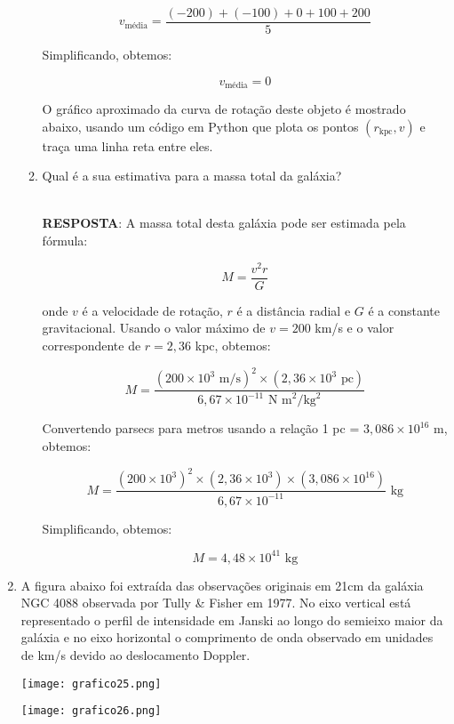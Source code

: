 \documentclass[a4paper,12pt]{article}
\begin{document}
\begin{enumerate}
\begin{enumerate}
$$v_{\text{média}} = \frac{(-200) + (-100) + 0 + 100 + 200}{5}$$

Simplificando, obtemos:

$$v_{\text{média}} = 0$$

O gráfico aproximado da curva de rotação deste objeto é mostrado abaixo, usando um código em Python que plota os pontos $(r_{\text{kpc}}, v)$ e traça uma linha reta entre eles.

\noindent\hrulefill

\item Qual é a sua estimativa para a massa total da galáxia?

\noindent\hrulefill\\\textbf{RESPOSTA}: A massa total desta galáxia pode ser estimada pela fórmula:

$$M = \frac{v^2 r}{G}$$

onde $v$ é a velocidade de rotação, $r$ é a distância radial e $G$ é a constante gravitacional. Usando o valor máximo de $v = 200$ km/s e o valor correspondente de $r = 2,36$ kpc, obtemos:

$$M = \frac{(200 \times 10^3 \text{ m/s})^2 \times (2,36 \times 10^3 \text{ pc})}{6,67 \times 10^{-11} \text{ N m}^2/\text{kg}^2}$$

Convertendo parsecs para metros usando a relação 1 pc = $3,086 \times 10^{16}$ m, obtemos:

$$M = \frac{(200 \times 10^3)^2 \times (2,36 \times 10^3) \times (3,086 \times 10^{16})}{6,67 \times 10^{-11}} \text{ kg}$$

Simplificando, obtemos:

$$M = 4,48 \times 10^{41} \text{ kg}$$

\noindent\hrulefill

\end{enumerate}

\item A figura abaixo foi extraída das observações originais em 21cm da galáxia 
NGC 4088 observada por Tully \& Fisher em 1977. No eixo vertical está 
representado o perfil de intensidade em Janski ao longo do semieixo maior
da galáxia e no eixo horizontal o comprimento de onda observado em 
unidades de km/s devido ao deslocamento Doppler.

\begin{center}
\centering
\texttt{[image: grafico25.png]}
\end{center}

\begin{center}
\centering
\texttt{[image: grafico26.png]}
\end{center}


\end{enumerate}
\end{document}
